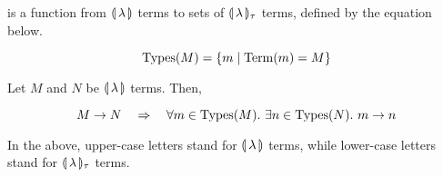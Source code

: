 \begin{definition}
   is a function from $\llparenthesis \, \lambda \, \rrparenthesis$ terms to sets of
  $\llparenthesis \, \lambda \, \rrparenthesis_\tau$ terms, defined by the equation below.
  
  $$
  \operatorname{Types}(M) = \{ m \mid \operatorname{Term}(m) = M \}
  $$
\end{definition}

\begin{lemma}
  \label{lem:infinite-chains}
  Let $M$ and $N$ be $\llparenthesis \, \lambda \, \rrparenthesis$ terms. Then,

  $$
  M \to N \quad \Rightarrow \quad
  \forall m \in \operatorname{Types}(M).\ \exists n \in \operatorname{Types}(N).\ m \to n
  $$
  
  In the above, upper-case letters stand for $\llparenthesis \, \lambda \, \rrparenthesis$ terms,
  while lower-case letters stand for $\llparenthesis \, \lambda \, \rrparenthesis_\tau$ terms.
\end{lemma}

